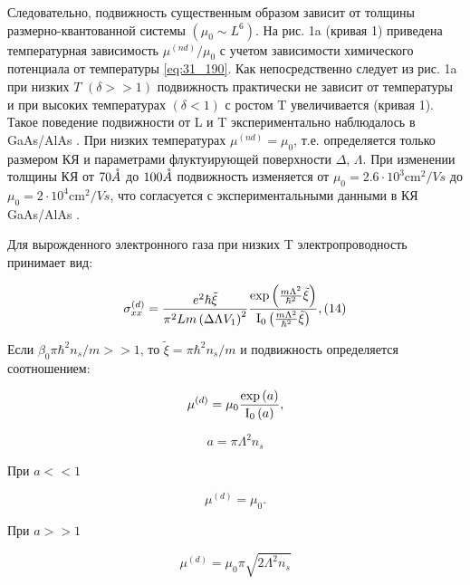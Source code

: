 Следовательно, подвижность существенным образом зависит от толщины размерно-квантованной системы $(\mu _{0} \sim L^{6} )$. На рис. 1a (кривая 1) приведена температурная зависимость $\mu ^{(nd)} /\mu _{0} $ с учетом зависимости химического потенциала от температуры \eqref{eq:31_190}. Как непосредственно следует из рис. 1a при низких $T$ $(\delta >>1)$ подвижность практически не зависит от температуры и при высоких температурах $(\delta <1)$ с ростом T увеличивается (кривая 1). Такое поведение подвижности от L и T экспериментально наблюдалось в GaAs/AlAs \cite{Sakaki1987}. При низких температурах $\mu ^{(nd)} =\mu _{0} $, т.е. определяется только размером КЯ и параметрами флуктуирующей поверхности $\Delta $, $\Lambda $. При изменении толщины КЯ от $70 \AA$ до $100 \AA$ подвижность изменяется от $\mu _{0} =2.6\cdot 10^{3} \text{cm}^{2} /{Vs}$ до $\mu _{0} =2\cdot 10^{4} \text{cm}^{2} /{Vs}$, что согласуется с экспериментальными данными в КЯ GaAs/AlAs \cite{Sakaki1987}.

Для вырожденного электронного газа при низких T электропроводность принимает вид:

\begin{equation} \label{eq:31_210}
\sigma _{xx}^{(d)} =\frac{e^{2} \hbar \tilde{\xi }}{\pi ^{2} Lm\left(\Delta \Lambda V_{1} \right)^{2} } \frac{{\rm exp}\left(\frac{m\Lambda ^{2} }{\hbar ^{2} } \tilde{\xi }\right)}{{\rm I}_{{\rm 0}} \left(\frac{m\Lambda ^{2} }{\hbar ^{2} } \tilde{\xi }\right)} ,    (14)
\end{equation}


Если $\beta _{0} \pi \hbar ^{2} n_{s} /m>>1$, то $\tilde{\xi }=\pi \hbar ^{2} n_{s} /m$ и подвижность определяется соотношением:

\begin{equation} \label{eq:31_220}
\mu ^{(d)} =\mu _{0} \frac{{\rm exp}\left(a\right)}{{\rm I}_{{\rm 0}} \left(a\right)},
\end{equation}

\[
a=\pi \Lambda ^{2} n_{s}
\]

При $a<<1$ 

\begin{equation} \label{eq:31_230}     
\mu ^{(d)} =\mu _{0}.
\end{equation}

При $a>>1$

\begin{equation} \label{eq:31_240}  
\mu ^{(d)} =\mu _{0} \pi \sqrt{2\Lambda ^{2} n_{s} }
\end{equation}

